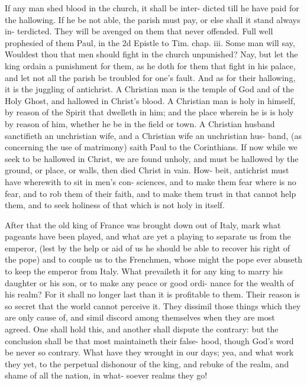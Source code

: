 \documentclass{custom}
\begin{document}
If any man shed blood in the church, it shall be inter- 
dicted till he have paid for the hallowing. If he be not 
able, the parish must pay, or else shall it stand always in- 
terdicted. They will be avenged on them that never 
offended. Full well prophesied of them Paul, in the 
2d Epistle to Tim. chap. iii. Some man will say, Wouldest 
thou that men should fight in the church unpunished? Nay, 
but let the king ordain a punishment for them, as he doth 
for them that fight in his palace, and let not all the parish 
be troubled for one's fault. And as for their hallowing, it 
is the juggling of antichrist. A Christian man is the 
temple of God and of the Holy Ghost, and hallowed in 
Christ's blood. A Christian man is holy in himself, by 
reason of the Spirit that dwelleth in him; and the place 
wherein he is is holy by reason of him, whether he be in 
the field or town. A Christian husband sanctifieth an 
unchristian wife, and a Christian wife an unchristian hus- 
band, (as concerning the use of matrimony) saith Paul to 
the Corinthians. If now while we seek to be hallowed in 
Christ, we are found unholy, and must be hallowed by the 
ground, or place, or walls, then died Christ in vain. How- 
beit, antichrist must have wherewith to sit in men's con- 
sciences, and to make them fear where is no fear, and 
to rob them of their faith, and to make them trust in 
that cannot help them, and to seek holiness of that which 
is not holy in itself. 

After that the old king of France was brought down out 
of Italy, mark what pageants have been played, and what 
are yet a playing to separate us from the emperor, (lest by 
the help or aid of us he should be able to recover his right 
of the pope) and to couple us to the Frenchmen, whose 
might the pope ever abuseth to keep the emperor from 
Italy. What prevaileth it for any king to marry his 
daughter or his son, or to make any peace or good ordi- 
nance for the wealth of his realm? For it shall no longer 
last than it is profitable to them. Their reason is so secret 
that the world cannot perceive it. They dissimil those 
things which they are only cause of, and simil discord 
among themselves when they are most agreed. One shall 
hold this, and another shall dispute the contrary: but 
the conclusion shall be that most maintaineth their false- 
hood, though God's word be never so contrary. What 
have they wrought in our days; yea, and what work 
they yet, to the perpetual dishonour of the king, and 
rebuke of the realm, and shame of all the nation, in what- 
soever realms they go! 
\end{document}
